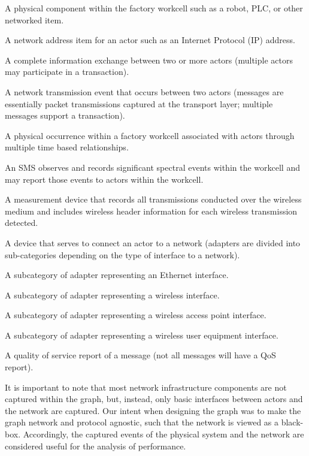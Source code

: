 \begin{description}[style=sameline]
    \item[Actor]  A physical component within the factory workcell such as a robot, PLC, or other networked item.
    \item[NtwkID] A network address item for an actor such as an Internet Protocol (IP) address.
    \item[Transaction] A complete information exchange between two or more actors (multiple actors may participate in a transaction).
    \item[Message] A network transmission event that occurs between two actors (messages are essentially packet transmissions captured at the transport layer; multiple messages support a transaction).
    \item[Physical Action]  A physical occurrence within a factory workcell associated with actors through multiple time based relationships.
    \item[SMS] An SMS observes and records significant spectral events within the workcell and may report those events to actors within the workcell.  
    \item[Sniffer] A measurement device that records all transmissions conducted over the wireless medium and includes wireless header information for each wireless transmission detected.
    \item[Adapter] A device that serves to connect an actor to a network (adapters are divided into sub-categories depending on the type of interface to a network).
    \item[Adapter:Ethernet] A subcategory of adapter representing an Ethernet interface. 
    \item[Adapter:Wireless] A subcategory of adapter representing a wireless interface. 
    \item[Adapter:Wireless:AP]  A subcategory of adapter representing a wireless access point interface.
    \item[Adapter:Wireless:UE] A subcategory of adapter representing a wireless user equipment interface.
    \item[QoS Report] A quality of service report of a message (not all messages will have a QoS report).
\end{description}

It is important to note that most network infrastructure components are not captured within the graph, but, instead, only basic interfaces between actors and the network are captured.  Our intent when designing the graph was to make the graph network and protocol agnostic, such that the network is viewed as a black-box. Accordingly, the captured events of the physical system and the network are considered useful for the analysis of performance. 


